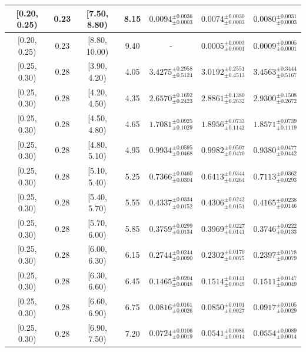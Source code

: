 \begin{longtable}{|c|c|c|c|c|c|c|}
\hline
[0.20, 0.25) & 0.23 & [7.50, 8.80) & 8.15 & $0.0094^{ \pm 0.0036 }_{ \pm 0.0003 }$ & $0.0074^{ \pm 0.0030 }_{ \pm 0.0003 }$ & $0.0080^{ \pm 0.0031 }_{ \pm 0.0003 }$ \\ 
\hline
[0.20, 0.25) & 0.23 & [8.80, 10.00) & 9.40 & - & $0.0005^{ \pm 0.0003 }_{ \pm 0.0001 }$ & $0.0009^{ \pm 0.0005 }_{ \pm 0.0001 }$ \\ 
\hline
[0.25, 0.30) & 0.28 & [3.90, 4.20) & 4.05 & $3.4275^{ \pm 0.2958 }_{ \pm 0.5124 }$ & $3.0192^{ \pm 0.2551 }_{ \pm 0.4513 }$ & $3.4563^{ \pm 0.3444 }_{ \pm 0.5167 }$ \\ 
\hline
[0.25, 0.30) & 0.28 & [4.20, 4.50) & 4.35 & $2.6570^{ \pm 0.1692 }_{ \pm 0.2423 }$ & $2.8861^{ \pm 0.1380 }_{ \pm 0.2632 }$ & $2.9300^{ \pm 0.1508 }_{ \pm 0.2672 }$ \\ 
\hline
[0.25, 0.30) & 0.28 & [4.50, 4.80) & 4.65 & $1.7081^{ \pm 0.0925 }_{ \pm 0.1029 }$ & $1.8956^{ \pm 0.0733 }_{ \pm 0.1142 }$ & $1.8571^{ \pm 0.0739 }_{ \pm 0.1119 }$ \\ 
\hline
[0.25, 0.30) & 0.28 & [4.80, 5.10) & 4.95 & $0.9934^{ \pm 0.0595 }_{ \pm 0.0468 }$ & $0.9982^{ \pm 0.0507 }_{ \pm 0.0470 }$ & $0.9380^{ \pm 0.0477 }_{ \pm 0.0442 }$ \\ 
\hline
[0.25, 0.30) & 0.28 & [5.10, 5.40) & 5.25 & $0.7366^{ \pm 0.0460 }_{ \pm 0.0304 }$ & $0.6413^{ \pm 0.0344 }_{ \pm 0.0264 }$ & $0.7113^{ \pm 0.0362 }_{ \pm 0.0293 }$ \\ 
\hline
[0.25, 0.30) & 0.28 & [5.40, 5.70) & 5.55 & $0.4337^{ \pm 0.0334 }_{ \pm 0.0152 }$ & $0.4306^{ \pm 0.0242 }_{ \pm 0.0151 }$ & $0.4165^{ \pm 0.0238 }_{ \pm 0.0146 }$ \\ 
\hline
[0.25, 0.30) & 0.28 & [5.70, 6.00) & 5.85 & $0.3759^{ \pm 0.0299 }_{ \pm 0.0134 }$ & $0.3969^{ \pm 0.0227 }_{ \pm 0.0141 }$ & $0.3746^{ \pm 0.0222 }_{ \pm 0.0133 }$ \\ 
\hline
[0.25, 0.30) & 0.28 & [6.00, 6.30) & 6.15 & $0.2744^{ \pm 0.0244 }_{ \pm 0.0090 }$ & $0.2302^{ \pm 0.0170 }_{ \pm 0.0075 }$ & $0.2397^{ \pm 0.0178 }_{ \pm 0.0079 }$ \\ 
\hline
[0.25, 0.30) & 0.28 & [6.30, 6.60) & 6.45 & $0.1465^{ \pm 0.0204 }_{ \pm 0.0048 }$ & $0.1514^{ \pm 0.0141 }_{ \pm 0.0049 }$ & $0.1511^{ \pm 0.0147 }_{ \pm 0.0049 }$ \\ 
\hline
[0.25, 0.30) & 0.28 & [6.60, 6.90) & 6.75 & $0.0816^{ \pm 0.0161 }_{ \pm 0.0026 }$ & $0.0850^{ \pm 0.0101 }_{ \pm 0.0027 }$ & $0.0917^{ \pm 0.0105 }_{ \pm 0.0029 }$ \\ 
\hline
[0.25, 0.30) & 0.28 & [6.90, 7.50) & 7.20 & $0.0724^{ \pm 0.0106 }_{ \pm 0.0019 }$ & $0.0541^{ \pm 0.0086 }_{ \pm 0.0014 }$ & $0.0554^{ \pm 0.0089 }_{ \pm 0.0014 }$ \\ 

\end{longtable}
